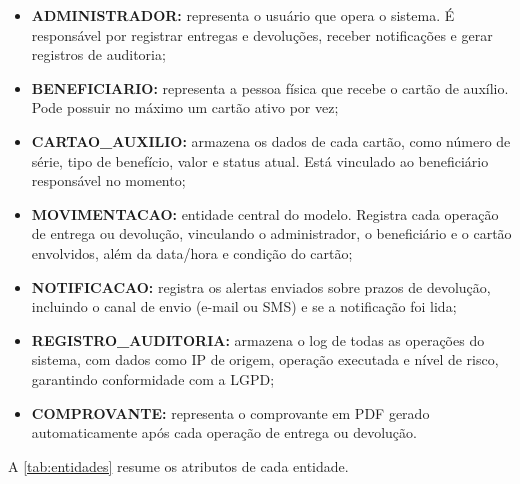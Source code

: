 \documentclass[
  article,
  a4paper,
  12pt,
  oneside,
  fleqn
]{abntex2}
\begin{document}
\begin{itemize}
    \item \textbf{ADMINISTRADOR:} representa o usuário que opera o sistema. É responsável por registrar entregas e devoluções, receber notificações e gerar registros de auditoria;

    \item \textbf{BENEFICIARIO:} representa a pessoa física que recebe o cartão de auxílio. Pode possuir no máximo um cartão ativo por vez;

    \item \textbf{CARTAO\_AUXILIO:} armazena os dados de cada cartão, como número de série, tipo de benefício, valor e status atual. Está vinculado ao beneficiário responsável no momento;

    \item \textbf{MOVIMENTACAO:} entidade central do modelo. Registra cada operação de entrega ou devolução, vinculando o administrador, o beneficiário e o cartão envolvidos, além da data/hora e condição do cartão;

    \item \textbf{NOTIFICACAO:} registra os alertas enviados sobre prazos de devolução, incluindo o canal de envio (e-mail ou SMS) e se a notificação foi lida;

    \item \textbf{REGISTRO\_AUDITORIA:} armazena o log de todas as operações do sistema, com dados como IP de origem, operação executada e nível de risco, garantindo conformidade com a LGPD;

    \item \textbf{COMPROVANTE:} representa o comprovante em PDF gerado automaticamente após cada operação de entrega ou devolução.
\end{itemize}

A \cref{tab:entidades} resume os atributos de cada entidade.
\end{document}

